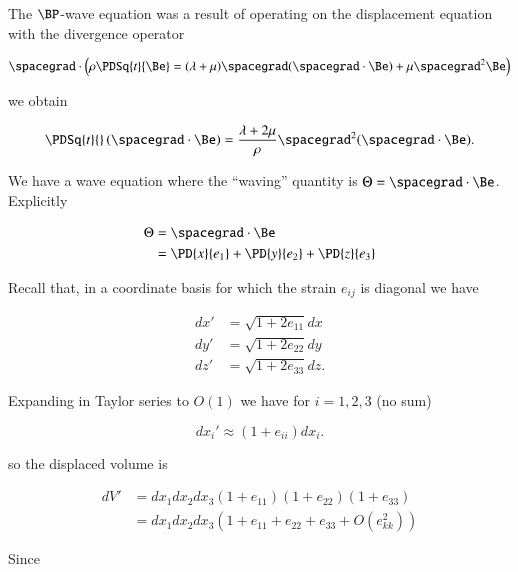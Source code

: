 \begin{Answer}[ref={problem:elastic:displacements:midtermQ1a}]
The $\BP$-wave equation was a result of operating on the displacement equation with the divergence operator

\begin{equation}\label{eqn:continuumMidTermReflection:10}
\spacegrad \cdot \left( 
\rho \PDSq{t}{\Be} = (\lambda + \mu) \spacegrad (\spacegrad \cdot \Be) + \mu \spacegrad^2 \Be
\right)
\end{equation}

we obtain

\begin{equation}\label{eqn:continuumMidTermReflection:30}
\PDSq{t}{} \left( \spacegrad \cdot \Be \right) = \frac{\lambda + 2 \mu}{\rho} \spacegrad^2 (\spacegrad \cdot \Be).
\end{equation}

We have a wave equation where the ``waving'' quantity is $\Theta = \spacegrad \cdot \Be$.  Explicitly

\begin{align*}
\Theta 
&= \spacegrad \cdot \Be \\
&= 
\PD{x}{e_1}
+\PD{y}{e_2}
+\PD{z}{e_3}
\end{align*}

Recall that, in a coordinate basis for which the strain $e_{ij}$ is diagonal we have

\begin{align}\label{eqn:continuumMidTermReflection:50}
dx' &= \sqrt{1 + 2 e_{11}} dx \\
dy' &= \sqrt{1 + 2 e_{22}} dy \\
dz' &= \sqrt{1 + 2 e_{33}} dz.
\end{align}

Expanding in Taylor series to $O(1)$ we have for $i = 1, 2, 3$ (no sum)

\begin{equation}\label{eqn:continuumMidTermReflection:70}
dx_i' \approx (1 + e_{ii}) dx_i.
\end{equation}

so the displaced volume is

\begin{align*}
dV' &= 
dx_1
dx_2
dx_3
(1 + e_{11})
(1 + e_{22})
(1 + e_{33}) \\
&=
dx_1
dx_2
dx_3
( 1  + e_{11} + e_{22} + e_{33} + O(e_{kk}^2) )
\end{align*}

Since 


\end{Answer}
